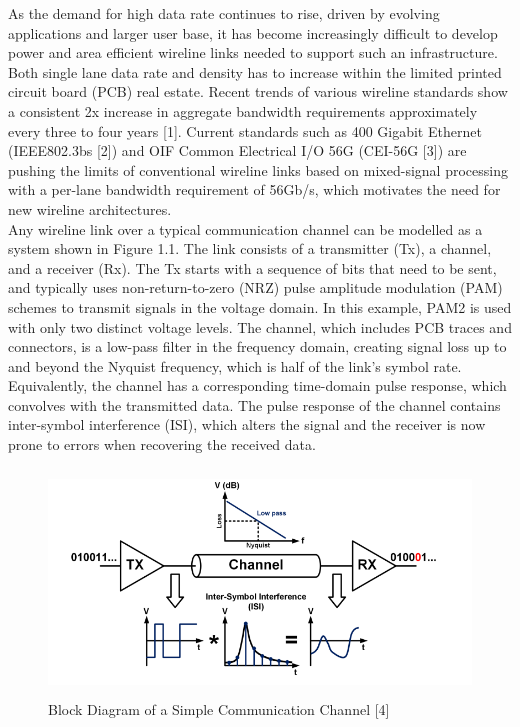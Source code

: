 As the demand for high data rate continues to rise, driven by evolving applications and larger user base, it has become increasingly difficult to develop power and area efficient wireline links needed to support such an infrastructure. Both single lane data rate and density has to increase within the limited printed circuit board (PCB) real estate. Recent trends of various wireline standards show a consistent 2x increase in aggregate bandwidth requirements approximately every three to four years [1]. Current standards such as 400 Gigabit Ethernet (IEEE802.3bs [2]) and OIF Common Electrical I/O 56G (CEI-56G [3]) are pushing the limits of conventional wireline links based on mixed-signal processing with a per-lane bandwidth requirement of 56Gb/s, which motivates the need for new wireline architectures.\\
Any wireline link over a typical communication channel can be modelled as a system shown in Figure 1.1. The link consists of a transmitter (Tx), a channel, and a receiver (Rx). The Tx starts with a sequence of bits that need to be sent, and typically uses non-return-to-zero (NRZ) pulse amplitude modulation (PAM) schemes to transmit signals in the voltage domain. In this example, PAM2 is used with only two distinct voltage levels. The channel, which includes PCB traces and connectors, is a low-pass filter in the frequency domain, creating signal loss up to and beyond the Nyquist frequency, which is half of the link's symbol rate. Equivalently, the channel has a corresponding time-domain pulse response, which convolves with the transmitted data. The pulse response of the channel contains inter-symbol interference (ISI), which alters the signal and the receiver is now prone to errors when recovering the received data.



\begin{figure}
	\centering
	\includegraphics[width=12cm,height=6cm]{fig1.png}
	\caption{Block Diagram of a Simple Communication Channel [4]}
	\label{block_diag}
\end{figure}

